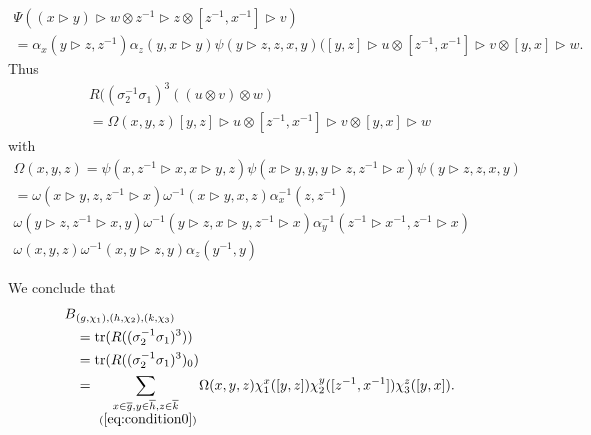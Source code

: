 \documentclass[a4paper, 10pt]{book}
\theoremstyle{definition}
\numberwithin{equation}{chapter}
\newcommand\ol[1]{\overline{#1}}
\newcommand\tr{\operatorname{tr}}
\newcommand\hit{\triangleright}
\newcommand\inv{^{-1}}
\newcommand\ot{\otimes}
\begin{document}
\begin{multline*}
\Psi((x\hit y)\hit w\ot z\inv\hit z\ot[z\inv,x\inv]\hit v) \\
  =\alpha_x(y\hit z, z\inv)\alpha_z(y, x\hit y)\psi(y\hit z,z,x,y)([y,z]\hit u\ot [z\inv,x\inv]\hit v\ot[y,x]\hit w.
\end{multline*}
Thus
\begin{multline*}
  R((\sigma_2\inv\sigma_1)^3((u\ot v)\ot w)\\
  =\Omega(x,y,z)[y,z]\hit u\ot[z\inv,x\inv]\hit v\ot [y,x]\hit w
\end{multline*}
with
\begin{multline}\label{omega}
\Omega(x,y,z)=\psi(x,z\inv\hit x,x\hit y,z)\psi(x\hit y,y,y\hit z,z\inv\hit x)\psi(y\hit z,z,x,y)\\
  =\omega(x\hit y,z,z\inv\hit x)\omega\inv(x\hit y,x,z)\alpha_x\inv(z,z\inv)\\
  \omega(y\hit z,z\inv\hit x,y)\omega\inv(y\hit z,x\hit y,z\inv\hit x)\alpha_y\inv(z\inv\hit x\inv,z\inv\hit x)\\
  \omega(x,y,z)\omega\inv(x,y\hit z,y)\alpha_z(y\inv,y)
\end{multline}

We conclude that
\begin{align*}
  B&_{(g,\chi_1),(h,\chi_2),(k,\chi_3)}\\&=\tr(R((\sigma_2\inv\sigma_1)^3))\\
  &=\tr(R((\sigma_2\inv\sigma_1)^3)_0)\\
  &=\sum_{\substack{x\in\ol g,y\in\ol h,z\in\ol k\\~(\cref{eq:condition0})}}\Omega(x,y,z)\chi_1^x([y,z])\chi_2^y([z\inv,x\inv])\chi_3^z([y,x]).
\end{align*}
\end{document}
